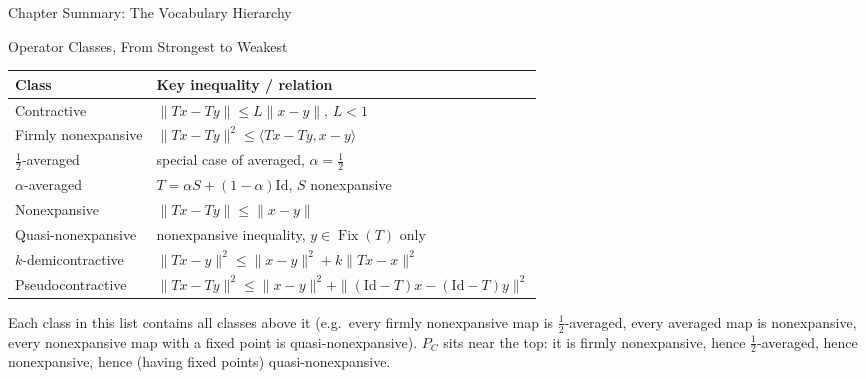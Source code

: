\documentclass[aspectratio=169,10pt]{beamer}
\DeclareMathOperator{\Fix}{Fix}
\newcommand{\Id}{\mathrm{Id}}
\begin{document}
\begin{frame}[allowframebreaks]{Chapter Summary: The Vocabulary Hierarchy}

  \begin{block}{Operator Classes, From Strongest to Weakest}
    \centering
    \begin{tabular}{ll}
      \toprule
      \textbf{Class} & \textbf{Key inequality / relation} \\
      \midrule
      Contractive & $\|Tx-Ty\|\le L\|x-y\|$, $L<1$ \\
      Firmly nonexpansive & $\|Tx-Ty\|^2 \le \langle Tx-Ty,x-y\rangle$ \\
      $\tfrac12$-averaged & special case of averaged, $\alpha=\tfrac12$ \\
      $\alpha$-averaged & $T=\alpha S+(1-\alpha)\Id$, $S$ nonexpansive \\
      Nonexpansive & $\|Tx-Ty\|\le \|x-y\|$ \\
      Quasi-nonexpansive & nonexpansive inequality, $y\in\Fix(T)$ only \\
      $k$-demicontractive & $\|Tx-y\|^2\le\|x-y\|^2+k\|Tx-x\|^2$ \\
      Pseudocontractive & $\|Tx-Ty\|^2\le\|x-y\|^2+\|(\Id-T)x-(\Id-T)y\|^2$ \\
      \bottomrule
    \end{tabular}
    \medskip

    Each class in this list contains all classes above it (e.g.\ every
    firmly nonexpansive map is $\tfrac12$-averaged, every averaged map is
    nonexpansive, every nonexpansive map with a fixed point is
    quasi-nonexpansive). $P_C$ sits near the top: it is firmly nonexpansive,
    hence $\tfrac12$-averaged, hence nonexpansive, hence (having fixed points)
    quasi-nonexpansive.
  \end{block}

  \framebreak


\end{frame}
\end{document}
